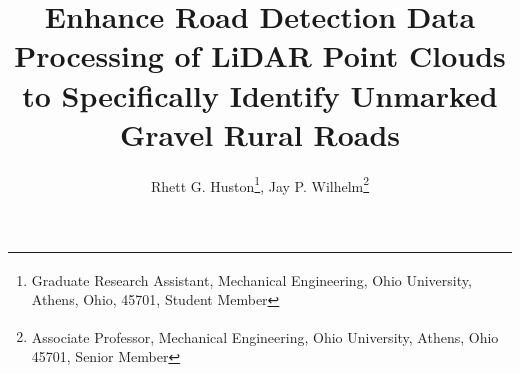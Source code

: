 \documentclass[journal,onecolumn]{IEEEtran}
\begin{document}
	\title{Enhance Road Detection Data Processing of LiDAR Point Clouds to Specifically Identify Unmarked Gravel Rural Roads}
	
	\author{Rhett G. Huston\textsuperscript{\textdagger}\thanks{\textsuperscript{\textdagger} Graduate Research Assistant, Mechanical Engineering, Ohio University, Athens, Ohio, 45701, Student Member}, Jay P. Wilhelm\textsuperscript{\textdaggerdbl}\thanks{\textsuperscript{\textdaggerdbl} Associate Professor, Mechanical Engineering, Ohio University, Athens, Ohio 45701, Senior Member}}
	
	
	
	
	
\end{document}
